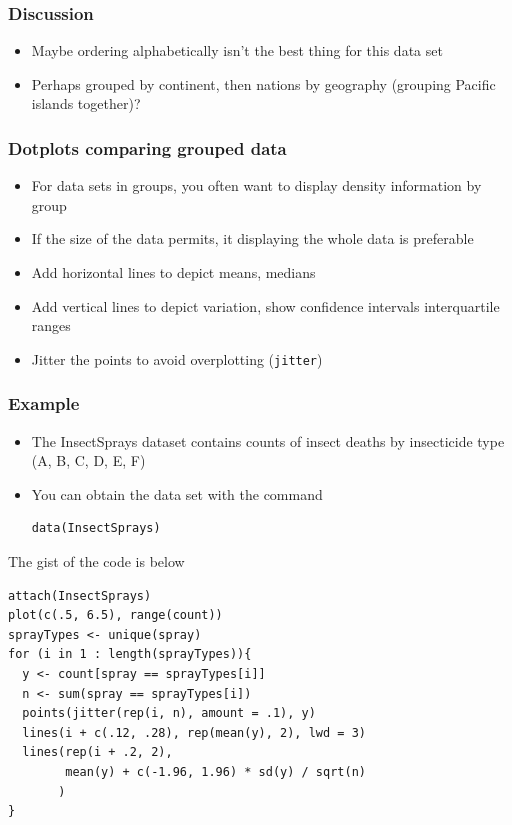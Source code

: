 \documentclass[aspectratio=169]{beamer}
\begin{document}
\begin{frame}\frametitle{Discussion}
\begin{itemize}
\item Maybe ordering alphabetically isn't the best thing for this data set
\item Perhaps grouped by continent, then nations by geography
  (grouping Pacific islands together)?
\end{itemize}
\end{frame}

\begin{frame}\frametitle{Dotplots comparing grouped data}
\begin{itemize}
\item For data sets in groups, you often want to display density
  information by group
\item If the size of the data permits, it displaying the whole data
  is preferable
\item Add horizontal lines to depict means, medians
\item Add vertical lines to depict variation, show confidence intervals
  interquartile ranges
\item Jitter the points to avoid overplotting (\texttt{jitter})
\end{itemize}
\end{frame}

\begin{frame}[fragile]\frametitle{Example}
\begin{itemize}
\item The InsectSprays dataset contains counts of insect deaths by
  insecticide type (A, B, C, D, E, F)
\item You can obtain the data set with the command
\begin{verbatim}
data(InsectSprays)
\end{verbatim}
\end{itemize}
\end{frame}

\begin{frame}[fragile]
  The gist of the code is below
\begin{verbatim}
attach(InsectSprays)
plot(c(.5, 6.5), range(count))
sprayTypes <- unique(spray)
for (i in 1 : length(sprayTypes)){
  y <- count[spray == sprayTypes[i]]
  n <- sum(spray == sprayTypes[i])
  points(jitter(rep(i, n), amount = .1), y)
  lines(i + c(.12, .28), rep(mean(y), 2), lwd = 3)
  lines(rep(i + .2, 2), 
        mean(y) + c(-1.96, 1.96) * sd(y) / sqrt(n)
       )
}
\end{verbatim}
\end{frame}
\end{document}
